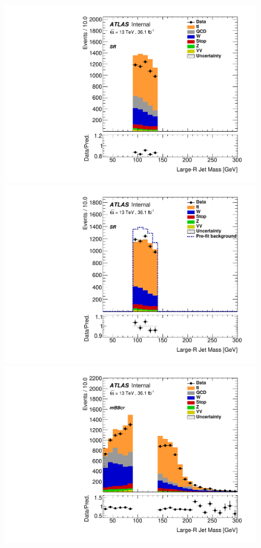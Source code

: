 \begin{figure}[!htbp]
\begin{center}
\includegraphics[scale=0.33]{./figures/boosted/ABCD_1tag0bjet/QCDFloat_1tag_SRFit_SR_El_Prefit} 
\includegraphics[scale=0.33]{./figures/boosted/ABCD_1tag0bjet/QCDFloat_1tag_SRFit_SR_El_Postfit}\\
\includegraphics[scale=0.33]{./figures/boosted/ABCD_1tag0bjet/QCDFloat_1tag_mBBcrFit_mBBcr_El_Prefit} 

\end{center}
\end{figure}
